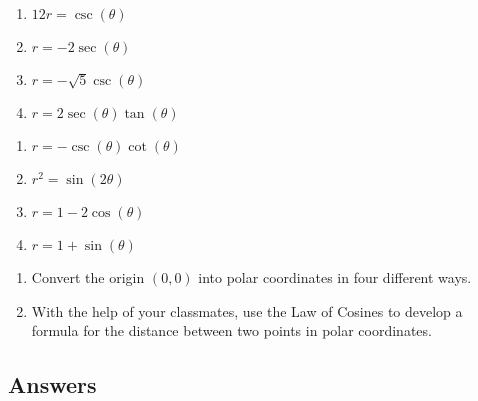 \documentclass{ximera}
\begin{document}
\begin{multicols}{4} 

\begin{enumerate}

\setcounter{enumi}{\value{HW}}

\item $12r = \csc(\theta)$
\item $r = -2\sec(\theta)$
\item $r = -\sqrt{5} \csc(\theta)$ 
\item \small $r = 2\sec(\theta)\tan(\theta)$ \normalsize

\setcounter{HW}{\value{enumi}}

\end{enumerate}

\end{multicols}

\begin{multicols}{4} 

\begin{enumerate}

\setcounter{enumi}{\value{HW}}

\item \small $r = -\csc(\theta) \cot(\theta)$ \normalsize
\item $r^{2} = \sin(2\theta)$
\item $r = 1 - 2\cos(\theta)$
\item $r = 1 + \sin(\theta)$ \label{equpolartorectlast}

\setcounter{HW}{\value{enumi}}

\end{enumerate}

\end{multicols}

\begin{enumerate}

\setcounter{enumi}{\value{HW}}

\item Convert the origin $(0,0)$ into polar coordinates in four different ways.

\item With the help of your classmates, use the Law of Cosines to develop a formula for the distance between two points in polar coordinates.

\setcounter{HW}{\value{enumi}}

\end{enumerate}

\newpage

\subsection{Answers}
\end{document}
